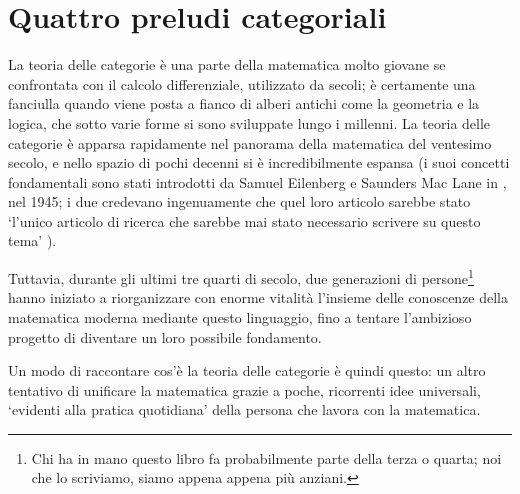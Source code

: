 \chapter{Quattro preludi categoriali}\label{cap_preludi}
La teoria delle categorie è una parte della matematica molto giovane se confrontata con il calcolo differenziale, utilizzato da secoli; è certamente una fanciulla quando viene posta a fianco di alberi antichi come la geometria e la logica, che sotto varie forme si sono sviluppate lungo i millenni. La teoria delle categorie è apparsa rapidamente nel panorama della matematica del ventesimo secolo, e nello spazio di pochi decenni si è incredibilmente espansa (i suoi concetti fondamentali sono stati introdotti da Samuel Eilenberg e Saunders Mac Lane in \cite{gtone}, nel 1945; i due credevano ingenuamente che quel loro articolo sarebbe stato `l'unico articolo di ricerca che sarebbe mai stato necessario scrivere su questo tema' \cite{maclane1988concepts}).

Tuttavia, durante gli ultimi tre quarti di secolo, due generazioni di persone\footnote{Chi ha in mano questo libro fa probabilmente parte della terza o quarta; noi che lo scriviamo, siamo appena appena più anziani.} hanno iniziato a riorganizzare con enorme vitalità l'insieme delle conoscenze della matematica moderna mediante questo linguaggio, fino a tentare l'ambizioso progetto di diventare un loro possibile fondamento.

Un modo di raccontare cos'è la teoria delle categorie è quindi questo: un altro tentativo di unificare la matematica grazie a poche, ricorrenti idee universali, `evidenti alla pratica quotidiana' della persona che lavora con la matematica.
\medskip

